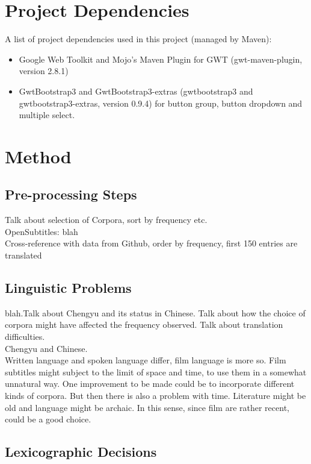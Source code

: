 \documentclass[11pt]{article} %
\begin{document}
\section{Project Dependencies}
A list of project dependencies used in this project (managed by Maven):
\begin{itemize}
\item Google Web Toolkit and Mojo's Maven Plugin for GWT  (gwt-maven-plugin, version 2.8.1)
\item GwtBootstrap3 and GwtBootstrap3-extras (gwtbootstrap3 and gwtbootstrap3-extras, version 0.9.4) for button group, button dropdown and multiple select.
\end{itemize}

\section{Method}
\subsection{Pre-processing Steps}
\indent Talk about selection of Corpora, sort by frequency etc.\\
\indent OpenSubtitles: blah\\
\indent Cross-reference with data from Github, order by frequency, first 150 entries are translated

\subsection{Linguistic Problems}

\indent blah.Talk about Chengyu and its status in Chinese. Talk about how the choice of corpora might have affected the frequency observed. Talk about translation difficulties.\\
Chengyu and Chinese.\\
Written language and spoken language differ, film language is more so. Film subtitles might subject to the limit of space and time, to use them in a somewhat unnatural way. One improvement to be made could be to incorporate different kinds of corpora. But then there is also a problem with time. Literature might be old and language might be archaic. In this sense, since film are rather recent, could be a good choice.\\

\subsection{Lexicographic Decisions}
\end{document}
